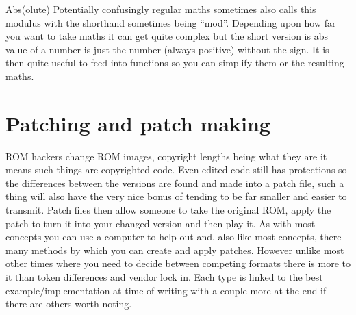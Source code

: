 \documentclass[
]{book}
\begin{document}
Abs(olute) Potentially confusingly regular maths sometimes also calls this modulus with the shorthand sometimes being ``mod''. Depending upon how far you want to take maths it can get quite complex but the short version is abs value of a number is just the number (always positive) without the sign. It is then quite useful to feed into functions so you can simplify them or the resulting maths.

\hypertarget{patching-and-patch-making}{%
\section{Patching and patch making}\label{patching-and-patch-making}}

ROM hackers change ROM images, copyright lengths being what they are it means such things are copyrighted code. Even edited code still has protections so the differences between the versions are found and made into a patch file, such a thing will also have the very nice bonus of tending to be far smaller and easier to transmit. Patch files then allow someone to take the original ROM, apply the patch to turn it into your changed version and then play it. As with most concepts you can use a computer to help out and, also like most concepts, there many methods by which you can create and apply patches. However unlike most other times where you need to decide between competing formats there is more to it than token differences and vendor lock in. Each type is linked to the best example/implementation at time of writing with a couple more at the end if there are others worth noting.
\end{document}
